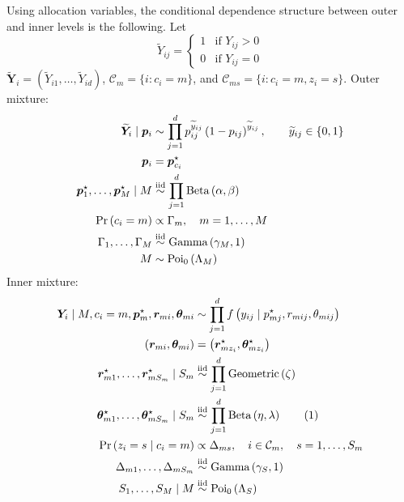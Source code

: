 \documentclass[11pt]{article}
\newcommand{\iid}{\overset{\textnormal{iid}}{\sim}}
\begin{document}
Using allocation variables, the conditional dependence structure between outer and inner levels is the following. Let 
\begin{equation}
\label{eq:ytilde}
\widetilde{Y}_{ij} =
\begin{cases}
	1 &\text{if } Y_{ij} > 0\\
	0 &\text{if } Y_{ij} = 0
\end{cases}
\end{equation}
$\widetilde{\bm Y}_i = \left( \widetilde{Y}_{i1},\ldots,  \widetilde{Y}_{id}\right)$, $\mathcal{C}_m = \{i: c_i=m\}$, and $\mathcal{C}_{ms} = \{i: c_i=m, z_i = s\}$.
\noindent
\newline Outer mixture:
\begin{equation}
\label{eq:outermix}
\begin{aligned}
	\widetilde{\bm Y}_i \mid \bm p_i & \sim   \prod_{j=1}^d p_{ij}^{\widetilde{y}_{ij}}\left(1- p_{ij}\right)^{\widetilde{y}_{ij}}, \qquad \widetilde{y}_{ij} \in \{0,1\}
	\\
	\bm p_i & = \bm p^\star_{c_i} \\
	\bm p^\star_{1},\ldots, \bm p^\star_{M} \mid M &\iid \prod_{j=1}^d \text{Beta}\left(\alpha , \beta\right) \\ 
	\Pr\left(c_i = m\right) & \propto \Gamma_m , \quad m=1,\ldots ,M\\
	\Gamma_1, \ldots, \Gamma_M & \iid \text{Gamma}\left(\gamma_M,1\right) \\ 
	M %
	&\sim \text{Poi}_0\left(\Lambda_M\right) 
\end{aligned}
\end{equation}
\newline \noindent Inner mixture:
\begin{align*}
\bm Y_i \mid M, c_i = m, \bm p^\star_m, \bm r_{mi}, \bm \theta_{mi}   & \sim \prod_{j=1}^d f\left(y_{ij} \mid p_{mj}^\star , r_{mij}, \theta_{mij}\right)\\ 
\left(\bm r_{mi},\bm \theta_{mi}\right) & = \left(\bm r_{mz_i}^\star,\bm \theta_{mz_i}^\star\right) \\
\bm r_{m1}^\star,\ldots ,   \bm r_{mS_m}^\star \mid S_m & \iid \prod_{j=1}^d \text{Geometric}\left(\zeta\right) \\
\bm \theta_{m1}^\star,\ldots ,   \bm \theta_{mS_m}^\star \mid S_m & \iid \prod_{j=1}^d \text{Beta}\left(\eta,\lambda\right)\stepcounter{equation}\tag{\theequation}\label{eq:innerrmix} \\
\Pr\left(z_i = s\mid c_i= m\right) & \propto \Delta_{ms} , \quad i\in \mathcal{C}_m,\quad s=1,\ldots , S_m \\
\Delta_{m1}, \ldots, \Delta_{mS_m} & \iid \text{Gamma}\left(\gamma_S,1\right) \\S_1,\ldots, S_M \mid M 
&\iid \text{Poi}_0\left(\Lambda_S\right)
\end{align*}
\end{document}
